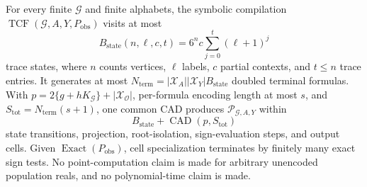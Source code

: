 For every finite \(\mathcal G\) and finite alphabets, the symbolic compilation \(\operatorname{TCF}(\mathcal G,A,Y,P_{\mathrm{obs}})\) visits at most \[B_{\mathrm{state}}(n,\ell,c,t)=6^n c\sum_{j=0}^{t}(\ell+1)^j\] trace states, where \(n\) counts vertices, \(\ell\) labels, \(c\) partial contexts, and \(t\leq n\) trace entries. It generates at most \(N_{\mathrm{term}}=|\mathcal X_A||\mathcal X_Y|B_{\mathrm{state}}\) doubled terminal formulas. With \(p=2\{g+hK_{\mathcal G}\}+|\mathcal X_{\mathcal O}|\), per-formula encoding length at most \(s\), and \(S_{\mathrm{tot}}=N_{\mathrm{term}}(s+1)\), one common CAD produces \(\mathscr P_{\mathcal G,A,Y}\) within \[B_{\mathrm{state}}+\operatorname{CAD}(p,S_{\mathrm{tot}})\] state transitions, projection, root-isolation, sign-evaluation steps, and output cells. Given \(\operatorname{Exact}(P_{\mathrm{obs}})\), cell specialization terminates by finitely many exact sign tests. No point-computation claim is made for arbitrary unencoded population reals, and no polynomial-time claim is made.